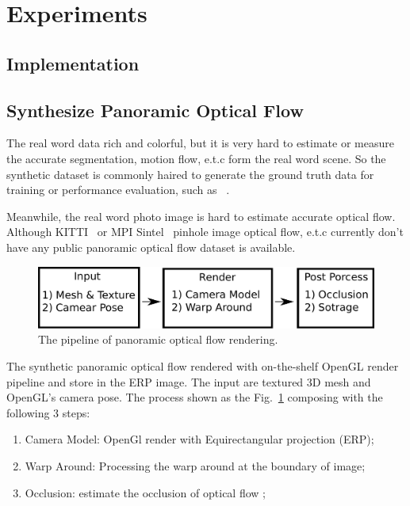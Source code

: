 \section{Experiments}\label{sec:exp}


\subsection{Implementation}



\subsection{Synthesize Panoramic Optical Flow}\label{sec:app:panoof}

The real word data rich and colorful, but it is very hard to estimate or measure the accurate segmentation, motion flow, e.t.c form the real word scene.
So the synthetic dataset is commonly haired to generate the ground truth data for training or performance evaluation, such as ~\cite{habitat19iccv}.

Meanwhile, the real word photo image is hard to estimate accurate optical flow.
Although KITTI~\cite{Menze2018JPRS} or MPI Sintel~\cite{Butler:ECCV:2012} pinhole image optical flow, e.t.c currently don't have any public panoramic optical flow dataset is available.

\begin{figure}[hbt!]
	\centering
	\includegraphics[width=\linewidth]{images/synthetic_optical_flow/of_render.pdf}
	\caption{The pipeline of panoramic optical flow rendering.}
	\label{fig:approach:panoof:pipline}
\end{figure}

The synthetic panoramic optical flow rendered with on-the-shelf OpenGL render pipeline and store in the ERP image.
The input are textured 3D mesh and OpenGL's camera pose.
The process shown as the Fig.~\ref{fig:approach:panoof:pipline} composing with the following 3 steps:

\begin{enumerate}
	\item Camera Model: OpenGl render with Equirectangular projection (ERP);
	\item Warp Around: Processing the warp around at the boundary of image;
	\item Occlusion: estimate the occlusion of optical flow ;
\end{enumerate}

